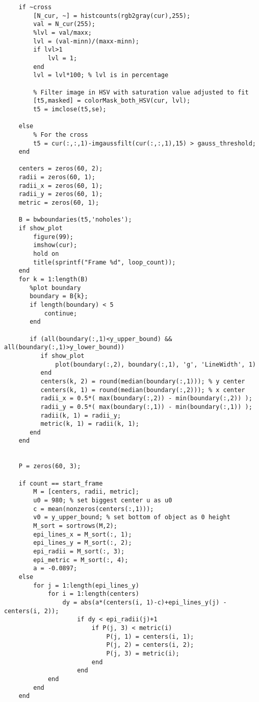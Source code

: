 \begin{appendices}
\begin{verbatim}
    if ~cross
        [N_cur, ~] = histcounts(rgb2gray(cur),255);
        val = N_cur(255);
        %lvl = val/maxx;
        lvl = (val-minn)/(maxx-minn);
        if lvl>1
            lvl = 1;
        end
        lvl = lvl*100; % lvl is in percentage

        % Filter image in HSV with saturation value adjusted to fit
        [t5,masked] = colorMask_both_HSV(cur, lvl);
        t5 = imclose(t5,se);
    
    else
        % For the cross
        t5 = cur(:,:,1)-imgaussfilt(cur(:,:,1),15) > gauss_threshold;
    end
    
    centers = zeros(60, 2);
    radii = zeros(60, 1);
    radii_x = zeros(60, 1);
    radii_y = zeros(60, 1);
    metric = zeros(60, 1);
    
    B = bwboundaries(t5,'noholes');
    if show_plot
        figure(99);
        imshow(cur);
        hold on
        title(sprintf("Frame %d", loop_count));
    end
    for k = 1:length(B)
       %plot boundary
       boundary = B{k};  
       if length(boundary) < 5
           continue;
       end
       
       if (all(boundary(:,1)<y_upper_bound) && all(boundary(:,1)>y_lower_bound)) 
          if show_plot
              plot(boundary(:,2), boundary(:,1), 'g', 'LineWidth', 1)
          end
          centers(k, 2) = round(median(boundary(:,1))); % y center
          centers(k, 1) = round(median(boundary(:,2))); % x center
          radii_x = 0.5*( max(boundary(:,2)) - min(boundary(:,2)) );
          radii_y = 0.5*( max(boundary(:,1)) - min(boundary(:,1)) );
          radii(k, 1) = radii_y;
          metric(k, 1) = radii(k, 1);
       end     
    end 
    
    
    P = zeros(60, 3);
    
    if count == start_frame
        M = [centers, radii, metric];
        u0 = 980; % set biggest center u as u0
        c = mean(nonzeros(centers(:,1)));
        v0 = y_upper_bound; % set bottom of object as 0 height
        M_sort = sortrows(M,2);
        epi_lines_x = M_sort(:, 1);
        epi_lines_y = M_sort(:, 2);
        epi_radii = M_sort(:, 3);
        epi_metric = M_sort(:, 4);
        a = -0.0897;
    else
        for j = 1:length(epi_lines_y)
            for i = 1:length(centers)
                dy = abs(a*(centers(i, 1)-c)+epi_lines_y(j) - centers(i, 2));
                    if dy < epi_radii(j)+1
                        if P(j, 3) < metric(i)
                            P(j, 1) = centers(i, 1);
                            P(j, 2) = centers(i, 2);
                            P(j, 3) = metric(i);
                        end
                    end
            end    
        end
    end
    

\end{verbatim}
\end{appendices}
